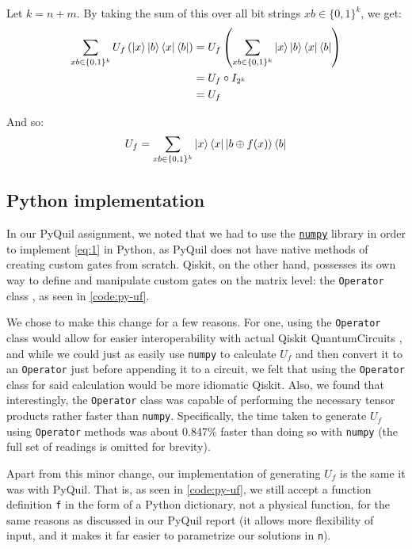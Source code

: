 \documentclass[12pt]{article}
\begin{document}
Let $k = n+m$. By taking the sum of this over all bit strings $xb \in \{0,1\}^k$, we get:
\begin{align*}
    \sum_{xb \in \{0,1\}^{k}}U_f\left(\ket{x}\ket{b}\bra{x}\bra{b}\right)
        &= U_f \left(\sum_{xb \in \{0,1\}^{k}}\ket{x}\ket{b}\bra{x}\bra{b}\right) \\
        &= U_f \circ I_{2^{k}} \\
        &= U_f
\end{align*}

And so:
\begin{equation}\label{eq:1}
        U_f = \sum_{xb \in \{0,1\}^{k}}\ket{x}\bra{x} \ket{b \oplus f(x)}\bra{b}
\end{equation}

\subsection{Python implementation}

In our PyQuil assignment, we noted that we had to use the \href{https://numpy.org/}{\texttt{numpy}} library in order to implement \autoref{eq:1} in Python, as PyQuil does not have native methods of creating custom gates from scratch.
Qiskit, on the other hand, possesses its own way to define and manipulate custom gates on the matrix level: the \texttt{Operator} class \cite{operators}, as seen in \autoref{code:py-uf}.

We chose to make this change for a few reasons.
For one, using the \texttt{Operator} class would allow for easier interoperability with actual Qiskit QuantumCircuits \cite{circuits}, and while we could just as easily use \texttt{numpy} to calculate $U_f$ and then convert it to an \texttt{Operator} just before appending it to a circuit, we felt that using the \texttt{Operator} class for said calculation would be more idiomatic Qiskit.
Also, we found that interestingly, the \texttt{Operator} class was capable of performing the necessary tensor products rather faster than \texttt{numpy}.
Specifically, the time taken to generate $U_f$ using \texttt{Operator} methods was about 0.847\% faster than doing so with \texttt{numpy} (the full set of readings is omitted for brevity).

Apart from this minor change, our implementation of generating $U_f$ is the same it was with PyQuil.
That is, as seen in \autoref{code:py-uf}, we still accept a function definition \texttt{f} in the form of a Python dictionary, not a physical function, for the same reasons as discussed in our PyQuil report (it allows more flexibility of input, and it makes it far easier to parametrize our solutions in \texttt{n}).
\end{document}
